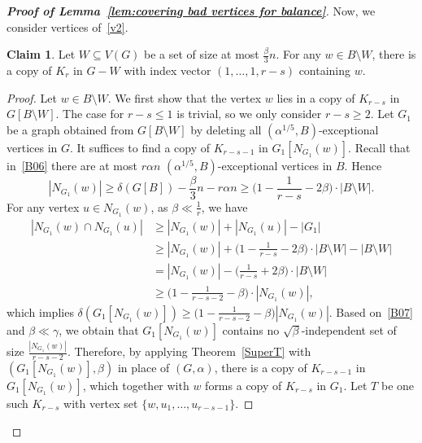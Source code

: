 \documentclass[11pt, a4paper]{article}
\theoremstyle{definition}
\newtheorem{claim}[theorem]{Claim}
\newcommand{\<}{\subseteq}
\newcommand{\de}{\delta}
\begin{document}
\begin{proof}[{\bf Proof of Lemma~\ref{lem:covering bad vertices for balance}}]
Now, we consider vertices of~\ref{v2}. %

\begin{claim}\label{claim:good Kr-s in B}
   Let $W\subseteq V(G)$ be a set of size at most $\frac{\beta}{3}n$. For any $w\in B\setminus W$, there is a copy of $K_r$ in $G-W$ with index vector $(1,\ldots,1,r-s)$ containing $w$.  
\end{claim}

\begin{proof}
Let $w\in B\setminus W$. We first show that the vertex $w$ lies in a copy of $K_{r-s}$ in $G[B\setminus W]$. 
The case for $r-s\le 1$ is trivial, so we only consider $r-s\geq 2$. Let $G_1$ be a graph obtained from $G[B\setminus W]$ by deleting all $(\alpha^{1/5},B)$-exceptional vertices in $G$. 
It suffices to find a copy of $K_{r-s-1}$ in $G_1[N_{G_1}(w)]$. Recall that in~\ref{B06} there are at most $r\alpha n$ $(\alpha^{1/5},B)$-exceptional vertices in $B$. Hence  
$$|N_{G_1}(w)|\ge \de(G[B])-\frac{\beta}{3} n-r\alpha n\ge \Big(1-\frac{1}{r-s}-2\beta\Big)\cdot{|B\setminus W|}.$$
For any vertex $u\in N_{G_1}(w)$, as $\beta\ll\frac{1}{r}$, we have 
\begin{align*}
|N_{G_1}(w)\cap N_{G_1}(u)|
&\ge |N_{G_1}(w)|+|N_{G_1}(u)|-|G_1|\\
&\ge |N_{G_1}(w)|+\Big(1-\frac{1}{r-s}-2\beta\Big)\cdot{|B\setminus W|}-|B\setminus W|\\
&= |N_{G_1}(w)|-\Big(\frac{1}{r-s}+2\beta\Big)\cdot{|B\setminus W|}\\
&\geq \Big(1-\frac{1}{r-s-2}-\beta\Big)\cdot|N_{G_1}(w)|,
\end{align*}
which implies $\de(G_1[N_{G_1}(w)])\ge \big(1-\frac{1}{r-s-2}-\beta\big)|N_{G_1}(w)|$. {Based on~\ref{B07} and $\beta\ll \gamma$, we obtain that $G_1[N_{G_1}(w)]$ contains no $\sqrt{\beta}$-independent set of size $\frac{|N_{G_1}(w)|}{r-s-2}$.  
Therefore, by applying Theorem~\ref{SuperT}  with $( G_1[N_{G_1}(w)], \beta)$ in place of $(G, \alpha)$,} there is a copy of $K_{r-s-1}$ in $G_1[N_{G_1}(w)]$, which together with $w$ forms a {copy of} $K_{r-s}$ in $G_1$. Let $T$ be {one such} $K_{r-s}$ with vertex set $\{w,u_1,\ldots,u_{r-s-1}\}$. 



\end{proof}
\end{proof}
\end{document}
